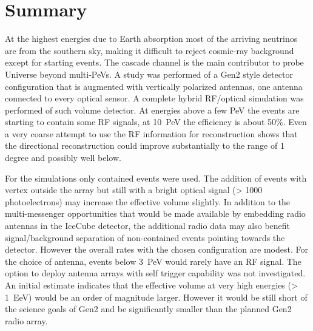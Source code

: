 \section{Summary}

  At the highest energies due to Earth absorption most of the arriving neutrinos are from the southern sky, making it difficult to reject cosmic-ray background except for starting events. The cascade channel is the main contributor to probe Universe beyond multi-PeVs. A study was performed of  a Gen2 style detector configuration
  that is augmented with vertically polarized antennas,
  one antenna connected to every optical sensor.  
  A complete hybrid RF/optical simulation was performed of such volume detector. 
  At energies above a few PeV the events are starting to contain 
  some RF signals, at 10~PeV the efficiency is about 50\%. 
  Even a very coarse attempt to use the RF information for reconstruction
  shows that the directional reconstruction could improve substantially to the
  range of 1 degree and possibly well below. 

  For the simulations only contained events were used. The addition of events with 
  vertex outside the array but still with a bright optical signal (> 1000 photoelectrons)  may increase the effective volume slightly. 
  In addition to the multi-messenger opportunities that would be made available by embedding radio antennas in the IceCube detector, the additional radio data may also benefit signal/background separation of non-contained events pointing towards the detector.
  However the overall rates with the chosen configuration are modest.
  For the choice of antenna, events below 3~PeV would rarely 
  have an RF signal.
  The option to deploy antenna arrays with self trigger
  capability was not investigated. An initial estimate indicates that the effective volume at very high energies (> 1~EeV) would be an order of magnitude larger. However it would be 
  still short of the science goals of Gen2 and be significantly smaller than
  the planned Gen2 radio array.  